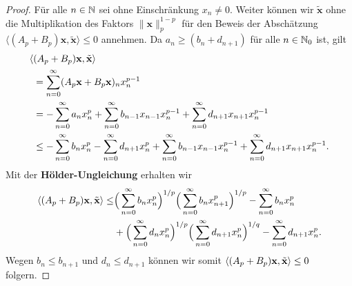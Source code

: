 \begin{proof}
\par
Für alle $n\in\mathbb{N}$ sei ohne Einschränkung $x_n\neq 0$. Weiter können wir  $\tilde{\textbf{x}}$ ohne die Multiplikation des Faktors $\|\textbf{x}\|_p^{1-p}$ für den Beweis der Abschätzung $\langle(A_p+B_p)\textbf{x} ,\tilde{\textbf{x}} \rangle\leq0$ annehmen. Da $a_n\geq (b_n + d_{n+1})$ für alle $n\in\mathbb{N}_0$ ist, gilt
\begin{align*}
\langle &(A_p+B_p)\textnormal{\textbf{x}}, \tilde{\textnormal{\textbf{x}}}\rangle\\
&= \sum_{n=0}^\infty (A_p\textnormal{\textbf{x}}+B_p\textnormal{\textbf{x}})_n x_n^{p-1}\\
&= -\sum_{n=0}^\infty a_n x_n^{p} + \sum_{n=0}^\infty b_{n-1} x_{n-1} x_n^{p-1} + \sum_{n=0}^\infty d_{n+1} x_{n+1}x_n^{p-1}\\
&\leq -\sum_{n=0}^\infty b_n x_n^p - \sum_{n=0}^\infty d_{n+1}x_n^p +\sum_{n=0}^\infty b_{n-1} x_{n-1} x_n^{p-1} + \sum_{n=0}^\infty d_{n+1}x_{n+1} x_n^{p-1}.
\end{align*}
Mit der \index{}\textbf{Hölder-Ungleichung} erhalten wir
\begin{align*}
\langle (A_p+B_p)\textnormal{\textbf{x}}, \tilde{\textbf{x}}\rangle 
\leq &\Big(\sum_{n=0}^\infty b_n x_n^p\Big)^{1/p}\Big(\sum_{n=0}^\infty b_n x_{n+1}^p\Big)^{1/p} - \sum_{n=0}^\infty b_n x_n^p\\
& + \Big(\sum_{n=0}^\infty d_n x_n^p \Big)^{1/p}\Big(\sum_{n=0}^\infty d_{n+1}x_n^p\Big)^{1/q} - \sum_{n=0}^\infty d_{n+1} x_n^p.
\end{align*}
Wegen $b_n\leq b_{n+1}$ und  $d_n\leq d_{n+1}$ können wir somit  $\langle (A_p+B_p)\textnormal{\textbf{x}}, \tilde{\textnormal{\textbf{x}}}\rangle \leq 0$ folgern.
\end{proof}



